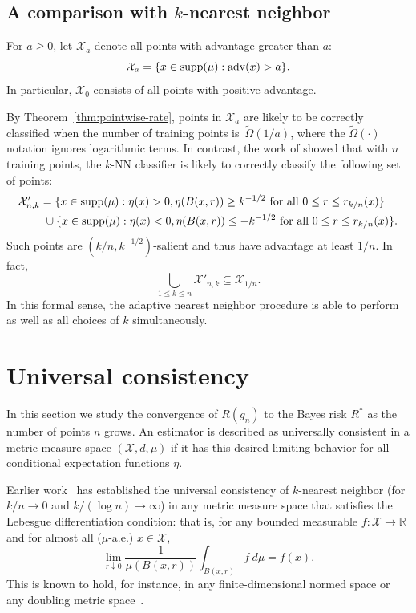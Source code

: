 \documentclass{article}
\def\R{{\mathbb{R}}}
\def\X{{\mathcal X}}
\def\supp{{\rm supp}}
\def\adv{{\rm adv}}
\begin{document}
\subsection{A comparison with $k$-nearest neighbor}
\label{sec:knn-comparison}

For $a \geq 0$, let $\X_a$ denote all points with advantage greater than $a$:
\begin{equation}
\X_a = \{x \in \supp(\mu): \adv(x) > a \} .
\label{eq:advantage-set}
\end{equation}
In particular, $\X_0$ consists of all points with positive advantage. 

By Theorem~\ref{thm:pointwise-rate}, points in $\X_a$ are likely to be correctly classified when the number of training points is~$\widetilde{\Omega}(1/a)$, where the $\widetilde{\Omega}(\cdot)$ notation ignores logarithmic terms.
In contrast, the work of \cite{ChaudhuriDasgupta2014} showed that with $n$ training points, the $k$-NN classifier is likely to correctly classify the following set of points:
\begin{align*}
\X'_{n,k} &= \{x \in \supp(\mu): \eta(x) > 0, \eta(B(x,r)) \geq k^{-1/2} \mbox{\ for all $0 \leq r \leq r_{k/n}(x)$}\} \\
&\ \cup \{x \in \supp(\mu): \eta(x) < 0, \eta(B(x,r)) \leq -k^{-1/2} \mbox{\ for all $0 \leq r \leq r_{k/n}(x)$}\} .
\end{align*}
Such points are $(k/n, k^{-1/2})$-salient and thus have advantage at least $1/n$. In fact,
$$ \bigcup_{1 \leq k \leq n} \X'_{n,k} \subseteq \X_{1/n} .$$
In this formal sense, the adaptive nearest neighbor procedure is able to perform as well as all choices of $k$ simultaneously.

\section{Universal consistency}\label{sec:gen2}
\label{sec:universal-consistency}

In this section we study the convergence of $R(g_n)$ to the Bayes risk $R^*$ as the number of points $n$ grows. An estimator is described as universally consistent in a metric measure space $(\X, d, \mu)$ if it has this desired limiting behavior for all conditional expectation functions $\eta$.

Earlier work~\cite{ChaudhuriDasgupta2014} has established the universal consistency of $k$-nearest neighbor (for $k/n \rightarrow 0$ and $k/(\log n) \rightarrow \infty$) in any metric measure space that satisfies the Lebesgue differentiation condition: that is, for any bounded measurable $f: \X \rightarrow \R$ and for almost all ($\mu$-a.e.) $x \in \X$,
\begin{equation}
\lim_{r \downarrow 0} \frac{1}{\mu(B(x,r))} \int_{B(x,r)} f \ d\mu = f(x) .
\label{eq:lebesgue-condition}
\end{equation}
This is known to hold, for instance, in any finite-dimensional normed space or any doubling metric space~\cite[Chapter 1]{H01}.
\end{document}
